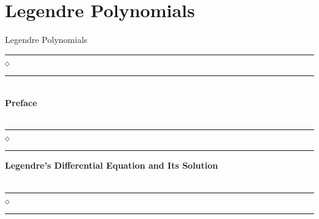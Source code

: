 \chapter[Appendix A]{Legendre Polynomials}{Legendre Polynomials}\label{appen1}
\begin{spacing}{1.25}
\vskip 20pt
\noindent
\rule{0.49\textwidth}{0.75pt} $_{\Diamond}$ \rule{0.49\textwidth}{0.75pt}\\
{\Large{\textbf{Preface}}}\\
\\
\rule{0.49\textwidth}{0.75pt} $_{\Diamond}$ \rule{0.49\textwidth}{0.75pt}
\end{spacing}
\newpage

\textbf{Legendre's Differential Equation and Its Solution}\\\\


\rule{0.46\textwidth}{0.75pt} $_{\Diamond}$ \rule{0.46\textwidth}{0.75pt}\\


